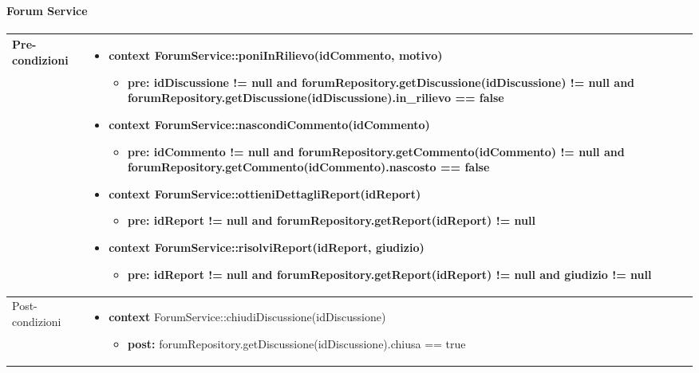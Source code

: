 \paragraph{Forum Service}
\small\begin{tabular}{|| l | p{28em} ||} 
	\hline
	Pre-condizioni & \begin{itemize}[leftmargin=*]
		\item \textbf{context} ForumService::poniInRilievo(idCommento, motivo)
		\begin{itemize}
			\item[ ] \textbf{pre:} idDiscussione != null and forumRepository.getDiscussione(idDiscussione) != null and forumRepository.getDiscussione(idDiscussione).in\_rilievo == false
		\end{itemize}

		\item \textbf{context} ForumService::nascondiCommento(idCommento)
		\begin{itemize}
			\item[ ] \textbf{pre:} idCommento != null and forumRepository.getCommento(idCommento) != null and forumRepository.getCommento(idCommento).nascosto == false
		\end{itemize}

		\item \textbf{context} ForumService::ottieniDettagliReport(idReport)
		\begin{itemize}
			\item[ ] \textbf{pre:} idReport != null and forumRepository.getReport(idReport) != null
		\end{itemize}

		\item \textbf{context} ForumService::risolviReport(idReport, giudizio)
		\begin{itemize}
			\item[ ] \textbf{pre:} idReport != null and forumRepository.getReport(idReport) != null and giudizio != null
		\end{itemize}
	\end{itemize}\\
	\hline
	Post-condizioni & \begin{itemize}[leftmargin=*]
		\item \textbf{context} ForumService::chiudiDiscussione(idDiscussione)
		\begin{itemize}
			\item[ ] \textbf{post:} forumRepository.getDiscussione(idDiscussione).chiusa == true
		\end{itemize}


\end{itemize}
\end{tabular}
